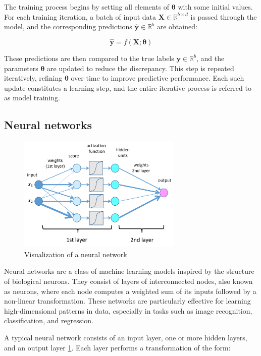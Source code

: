 \documentclass{pracalicmgr}
\begin{document}
The training process begins by setting all elements of \( \boldsymbol{\theta} \) with some initial values. For each training iteration, a batch of input data \( \mathbf{X} \in \mathbb{R}^{b \times d} \) is passed through the model, and the corresponding predictions \( \hat{\mathbf{y}} \in \mathbb{R}^b \) are obtained:

\[
\hat{\mathbf{y}} = f(\mathbf{X}; \boldsymbol{\theta})
\]

These predictions are then compared to the true labels \( \mathbf{y} \in \mathbb{R}^b \), and the parameters \( \boldsymbol{\theta} \) are updated to reduce the discrepancy. This step is repeated iteratively, refining \( \boldsymbol{\theta} \) over time to improve predictive performance. Each such update constitutes a learning step, and the entire iterative process is referred to as model training.

\subsection{Neural networks}

\begin{figure}[H]
\centering
\includegraphics[width=0.7\textwidth]{src/deepNet.png}
\caption{Visualization of a neural network \cite{deepLearningRoundup2025}}
\label{fig:deepN}
\end{figure}

Neural networks are a class of machine learning models inspired by the structure of biological neurons. They consist of layers of interconnected nodes, also known as neurons, where each node computes a weighted sum of its inputs followed by a non-linear transformation. These networks are particularly effective for learning high-dimensional patterns in data, especially in tasks such as image recognition, classification, and regression.

A typical neural network consists of an input layer, one or more hidden layers, and an output layer \ref{fig:deepN}. Each layer performs a transformation of the form:
\end{document}
